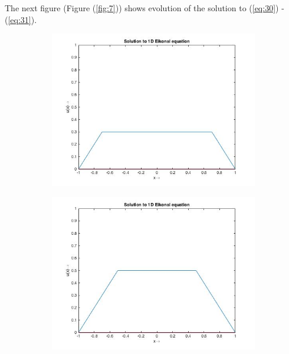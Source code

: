 \noindent
The next figure (Figure (\ref{fig:7})) shows evolution of the solution to (\ref{eq:30}) - (\ref{eq:31}).\\
\begin{figure}[h!]
	\begin{subfigure}{0.5\textwidth}
		\includegraphics[scale = 0.4]{Images/1deik/3.jpg}
	\end{subfigure}
	\begin{subfigure}{0.5\textwidth}
			\includegraphics[scale = 0.4]{Images/1deik/5.jpg}
	\end{subfigure}
	\begin{subfigure}{0.5\textwidth}

\end{subfigure}
\end{figure}
